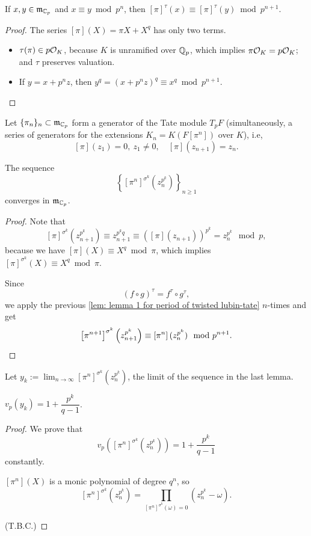 \begin{lemma}\label{lem: lemma 1 for period of twisted lubin-tate}
    If $x, y\in\mathfrak{m}_{\mathbb{C}_p}$ and $x\equiv y\bmod p^n$,
    then $[\pi]^\tau(x)\equiv [\pi]^\tau(y)\bmod p^{n+1}$.
\end{lemma}
\begin{proof}
    The series $[\pi](X) = \pi X + X^q$ has only two terms.\begin{itemize}
\item $\tau(\pi)\in p\mathcal{O}_K$, because $K$ is unramified over $\mathbb{Q}_p$, which implies $\pi \mathcal{O}_K = p\mathcal{O}_K$; and $\tau$ preserves valuation.
\item If $y = x + p^nz$, then $y^q = (x + p^nz)^q\equiv x^q\bmod p^{n+1}$.\qedhere
    \end{itemize}
\end{proof}

Let $\{\pi_n\}_n\subset\mathfrak{m}_{\mathbb{C}_p}$ form a generator of the Tate module $T_pF$ (simultaneously, a series of generators for the extensions $K_n = K(F[\pi^n])$ over $K$), i.e, \[[\pi](z_1) = 0,\ z_1\ne 0, \quad [\pi](z_{n+1}) = z_n.\]

\begin{lemma}\label{lem: lemma 2 for period of twisted lubin-tate}
    The sequence \[\left\{ \left[ \pi^n  \right]^{\sigma^k }\left( z_n^{p^k } \right) \right\}_{n\ge 1}\]
    converges in $\mathfrak{m}_{\mathbb{C}_p}$.
\end{lemma}
\begin{proof}
    Note that \[[\pi]^{\sigma^k}(z_{n + 1}^{p^k})\equiv z_{n+1}^{p^kq}\equiv \left( [\pi](z_{n+1}) \right)^{p^k} = z_{n}^{p^k} \mod p,\]
    because we have $[\pi](X)\equiv X^q\bmod \pi$,
    which implies $[\pi]^{\sigma^k}(X)\equiv X^q\bmod \pi$.
    
    Since \[(f\circ g)^\tau = f^\tau\circ g^\tau,\]
    we apply the previous \cref{lem: lemma 1 for period of twisted lubin-tate} $n$-times and get
    \[\left[ \pi^{n+1}  \right]^{\sigma^k}\left( z_{n+1}^{p^k}  \right)\equiv \left[ \pi^n \right](z_n^{p^k })\mod p^{n+1}.\qedhere\]
\end{proof}

Let $\displaystyle y_k := \lim_{n\to\infty}\left[ \pi^n  \right]^{\sigma^k }\left( z_n^{p^k } \right)$, the limit of the sequence in the last lemma.
\begin{lemma}\label{lem: lemma 3 for period of twisted lubin-tate}
    $v_p(y_k) = 1 + \dfrac{p^k}{q - 1}$.
\end{lemma}
\begin{proof}
    We prove that \[v_p\left( \left[ \pi^n  \right]^{\sigma^k }\left( z_n^{p^k } \right) \right) = 1 + \dfrac{p^k}{q-1} \]constantly.

    $[\pi^n](X)$ is a monic polynomial of degree $q^n$,
    so \[[\pi^n]^{\sigma^k }\left(z_n^{p^k}\right) = \prod_{[\pi^n]^{\sigma^k}(\omega) = 0}
    \left( z_n^{p^k} - \omega \right).\]

    (T.B.C.)
\end{proof}

